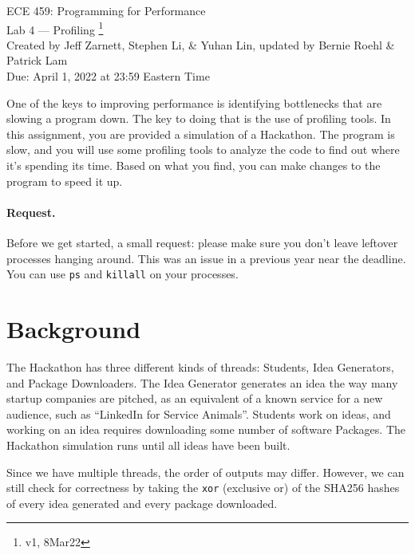 



\begin{center}
{\Large ECE 459: Programming for Performance}\\
{\Large Lab 4 --- Profiling \footnote{v1, 8Mar22}}\\[1em]
{
Created by Jeff Zarnett, Stephen Li, \& Yuhan Lin, updated by Bernie Roehl \& Patrick Lam
}\\
Due: April 1, 2022 at 23:59 Eastern Time
\end{center}


One of the keys to improving performance is identifying bottlenecks that are slowing a program down. The key to doing that is the use of profiling tools. In this assignment, you are provided a simulation of a Hackathon. The program is slow,  and you will use some profiling tools to analyze the code to find out where it's spending its time. Based on what you find, you can make changes to the program to speed it up. 

\paragraph{Request.} Before we get started, a small request: please make sure you don't leave leftover processes hanging around. This was an issue in a previous year near the deadline. You can use \texttt{ps} and \texttt{killall} on your processes.

\section*{Background}


The Hackathon has three different kinds of threads: Students, Idea Generators, and Package Downloaders. The Idea Generator generates an idea the way many startup companies are pitched, as an equivalent of a known service for a new audience, such as ``LinkedIn for Service Animals''. Students work on ideas, and working on an idea requires downloading some number of software Packages. The Hackathon simulation runs until all ideas have been built. 


Since we have multiple threads, the order of outputs may differ. However, we can still check for correctness by taking the \texttt{xor} (exclusive or) of the SHA256 hashes of every idea generated and every package downloaded. 

